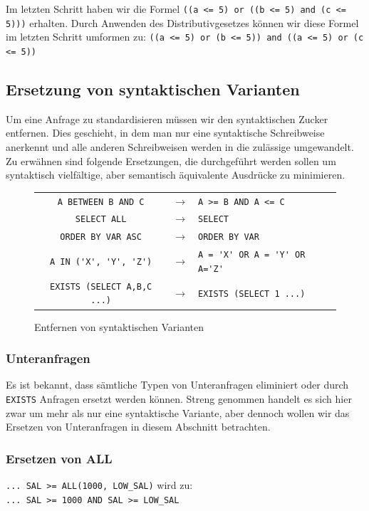 Im letzten Schritt haben wir die Formel \verb|((a <= 5) or ((b <= 5) and (c <= 5)))| erhalten. Durch Anwenden des Distributivgesetzes können wir diese Formel im letzten Schritt umformen zu: \verb|((a <= 5) or (b <= 5)) and ((a <= 5) or (c <= 5))|

\subsection{Ersetzung von syntaktischen Varianten}

Um eine Anfrage zu standardisieren müssen wir den syntaktischen Zucker entfernen. Dies geschieht, in dem man nur eine syntaktische Schreibweise anerkennt und alle anderen Schreibweisen werden in die zulässige umgewandelt. Zu erwähnen sind folgende Ersetzungen, die durchgeführt werden sollen um syntaktisch vielfältige, aber semantisch äquivalente Ausdrücke zu minimieren.

\begin{figure}[h]
\begin{tabular}{ccl}
\verb|A BETWEEN B AND C| & $\to$  & \verb|A >= B AND A <= C|\\
\verb|SELECT ALL| & $\to$ & \verb|SELECT|\\
\verb|ORDER BY VAR ASC| &  $\to$ & \verb|ORDER BY VAR|\\
\verb|A IN ('X', 'Y', 'Z')| & $\to$ & \verb|A = 'X' OR A = 'Y' OR A='Z'|\\
\verb|EXISTS (SELECT A,B,C ...)| & $\to$ & \verb|EXISTS (SELECT 1 ...)|\\
\end{tabular}
\caption{Entfernen von syntaktischen Varianten}
\end{figure}

\subsubsection*{Unteranfragen}

Es ist bekannt, dass sämtliche Typen von Unteranfragen eliminiert oder durch \verb|EXISTS| Anfragen ersetzt werden können. Streng genommen handelt es sich hier zwar um mehr als nur eine syntaktische Variante, aber dennoch wollen wir das Ersetzen von Unteranfragen in diesem Abschnitt betrachten.
\subsubsection*{Ersetzen von ALL}

\verb|... SAL >= ALL(1000, LOW_SAL)|  wird zu:\\
\verb|... SAL >= 1000 AND SAL >= LOW_SAL|

